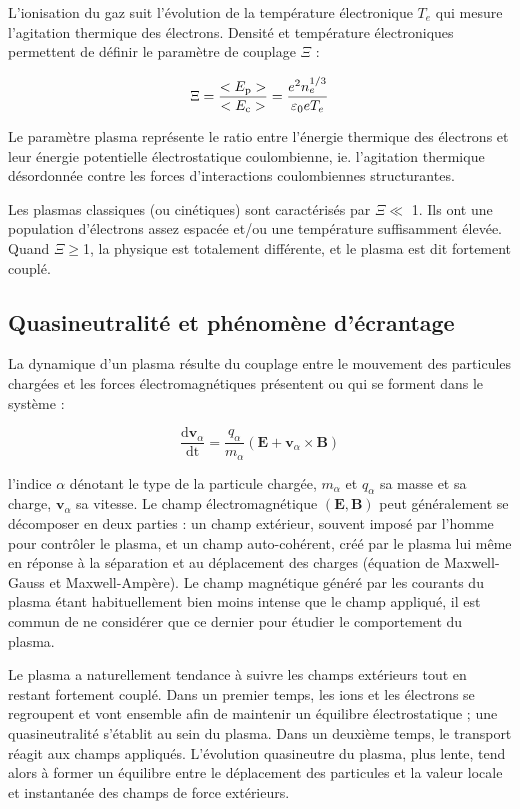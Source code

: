 \begin{refsection}
L'ionisation du gaz suit l'évolution de la température électronique $T_{e}$
qui mesure l'agitation thermique des électrons. Densité et température
électroniques permettent de définir le paramètre de couplage $\Xi$ :

\begin{equation}
\label{1-paramPlasma}
\Xi=\frac{<E_\text{p}>}{<E_\text{c}>}=\frac{e^{{2}}
n_{e}^{{1/3}}}{\varepsilon{_{0}} eT_{e}}
\end{equation}

Le paramètre plasma représente le ratio entre l'énergie thermique des
électrons et leur énergie potentielle électrostatique coulombienne, ie.
l'agitation thermique désordonnée contre les forces d'interactions
coulombiennes structurantes.

Les plasmas classiques (ou cinétiques) sont caractérisés par
$\Xi\ll$ 1. Ils ont une population d'électrons assez espacée et/ou une
température suffisamment élevée. Quand $\Xi\geq$1, la physique est totalement
différente, et le plasma est dit fortement couplé.

\subsection{Quasineutralité et phénomène d'écrantage}
La dynamique d'un plasma résulte du couplage entre le mouvement des
particules chargées et les forces électromagnétiques présentent ou qui se
forment dans le système :

\begin{equation}
\frac{\text{d} \mathbf
v_\alpha}{\text{dt}}=\frac{q_\alpha}{m_\alpha}(\mathbf E+ \mathbf
v_\alpha\times\mathbf B)
\end{equation}

l'indice $\alpha$ dénotant le type de la particule chargée, $m_\alpha$
et $q_\alpha$ sa masse et sa charge, $\mathbf v_\alpha$ sa vitesse. Le champ
électromagnétique $(\mathbf E,\mathbf B)$ peut généralement se décomposer en
deux parties :
un champ extérieur, souvent imposé par l'homme pour
contrôler le plasma, et un champ auto-cohérent, créé par le plasma lui même en
réponse à la séparation et au déplacement des charges (équation de
Maxwell-Gauss et Maxwell-Ampère).
Le champ magnétique généré par les courants du plasma étant
habituellement bien moins intense que le champ appliqué, il est commun de
ne considérer que ce dernier pour étudier le comportement du plasma.

Le plasma a naturellement tendance à suivre les champs extérieurs tout en
restant fortement couplé. Dans un premier temps, les ions et les électrons
se regroupent et vont ensemble afin de maintenir un équilibre électrostatique ;
une quasineutralité s'établit au sein du plasma. Dans un deuxième temps,
le transport réagit aux champs appliqués. L'évolution quasineutre du plasma,
plus lente, tend alors à former un équilibre entre le déplacement des particules
et la valeur locale et instantanée des champs de force extérieurs.


\end{refsection}
